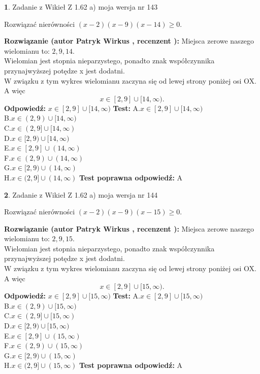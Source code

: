 \documentclass[12pt, a4paper]{article}
\theoremstyle{definition} %
\newtheorem{zad}{}
\newcommand{\zadStart}[1]{\begin{zad}#1\newline}
\newcommand{\zadStop}{\end{zad}}
\newcommand{\rozwStart}[2]{\noindent \textbf{Rozwiązanie (autor #1 , recenzent #2): }\newline}
\newcommand{\rozwStop}{\newline}
\newcommand{\odpStart}{\noindent \textbf{Odpowiedź:}\newline}
\newcommand{\odpStop}{\newline}
\newcommand{\testStart}{\noindent \textbf{Test:}\newline}
\newcommand{\testStop}{\newline}
\newcommand{\kluczStart}{\noindent \textbf{Test poprawna odpowiedź:}\newline}
\newcommand{\kluczStop}{\newline}
\begin{document}
\zadStart{Zadanie z Wikieł Z 1.62 a) moja wersja nr 143}

Rozwiązać nierówności $(x-2)(x-9)(x-14)\ge0$.
\zadStop
\rozwStart{Patryk Wirkus}{}
Miejsca zerowe naszego wielomianu to: $2, 9, 14$.\\
Wielomian jest stopnia nieparzystego, ponadto znak współczynnika przy\linebreak najwyższej potędze x jest dodatni.\\ W związku z tym wykres wielomianu zaczyna się od lewej strony poniżej osi OX. A więc $$x \in [2,9] \cup [14,\infty).$$
\rozwStop
\odpStart
$x \in [2,9] \cup [14,\infty)$
\odpStop
\testStart
A.$x \in [2,9] \cup [14,\infty)$\\
B.$x \in (2,9) \cup [14,\infty)$\\
C.$x \in (2,9] \cup [14,\infty)$\\
D.$x \in [2,9) \cup [14,\infty)$\\
E.$x \in [2,9] \cup (14,\infty)$\\
F.$x \in (2,9) \cup (14,\infty)$\\
G.$x \in [2,9) \cup (14,\infty)$\\
H.$x \in (2,9] \cup (14,\infty)$
\testStop
\kluczStart
A
\kluczStop



\zadStart{Zadanie z Wikieł Z 1.62 a) moja wersja nr 144}

Rozwiązać nierówności $(x-2)(x-9)(x-15)\ge0$.
\zadStop
\rozwStart{Patryk Wirkus}{}
Miejsca zerowe naszego wielomianu to: $2, 9, 15$.\\
Wielomian jest stopnia nieparzystego, ponadto znak współczynnika przy\linebreak najwyższej potędze x jest dodatni.\\ W związku z tym wykres wielomianu zaczyna się od lewej strony poniżej osi OX. A więc $$x \in [2,9] \cup [15,\infty).$$
\rozwStop
\odpStart
$x \in [2,9] \cup [15,\infty)$
\odpStop
\testStart
A.$x \in [2,9] \cup [15,\infty)$\\
B.$x \in (2,9) \cup [15,\infty)$\\
C.$x \in (2,9] \cup [15,\infty)$\\
D.$x \in [2,9) \cup [15,\infty)$\\
E.$x \in [2,9] \cup (15,\infty)$\\
F.$x \in (2,9) \cup (15,\infty)$\\
G.$x \in [2,9) \cup (15,\infty)$\\
H.$x \in (2,9] \cup (15,\infty)$
\testStop
\kluczStart
A
\kluczStop
\end{document}
